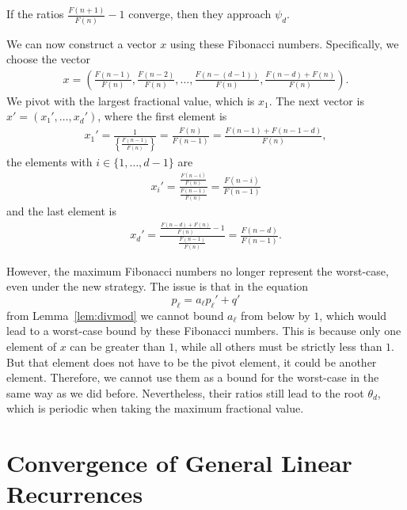 \begin{corollary}
  If the ratios $\frac{F(n+1)}{F(n)} - 1$ converge, then they approach $ψ_d$.
\end{corollary}

We can now construct a vector $x$ using these Fibonacci numbers.
Specifically, we choose the vector
\begin{align*}
  x = \left(
    \frac{F(n-1)}{F(n)},
    \frac{F(n-2)}{F(n)},
    …,
    \frac{F(n-(d-1))}{F(n)},
    \frac{F(n-d) + F(n)}{F(n)} \right).
\end{align*}
We pivot with the largest fractional value, which is $x_1$.
The next vector is $x' = (x₁', …, x_d')$,
where the first element is
\begin{align*}
  x_1'
  = \frac{1}{\left\{\frac{F(n-1)}{F(n)}\right\}}
  = \frac{F(n)}{F(n-1)}
  = \frac{F(n-1) + F(n-1-d)}{F(n)},
\end{align*}
the elements with $i ∈ \{1, …, d - 1\}$ are
\begin{align*}
  x_i'
  = \frac{\frac{F(n-i)}{F(n)}}{\frac{F(n-1)}{F(n)}}
  = \frac{F(n-i)}{F(n-1)}
\end{align*}
and the last element is
\begin{align*}
  x_d'
  = \frac{\frac{F(n-d) + F(n)}{F(n)} - 1}{\frac{F(n-1)}{F(n)}}
  = \frac{F(n-d)}{F(n-1)}.
\end{align*}

However, the maximum Fibonacci numbers no longer represent the worst-case, even
under the new strategy.
The issue is that in the equation
\[
  p_ℓ = a_ℓ p_ℓ' + q'
\]
from Lemma~\ref{lem:divmod} we cannot bound $a_ℓ$ from below by $1$,
which would lead to a worst-case bound by these Fibonacci numbers.
This is because only one element of $x$ can be greater than $1$,
while all others must be strictly less than $1$.
But that element does not have to be the pivot element,
it could be another element.
Therefore, we cannot use them as a bound for the worst-case
in the same way as we did before.
Nevertheless, their ratios still lead to the root $θ_d$,
which is periodic when taking the maximum fractional value.

\section{Convergence of General Linear Recurrences}
\label{sec:fib-conv}


